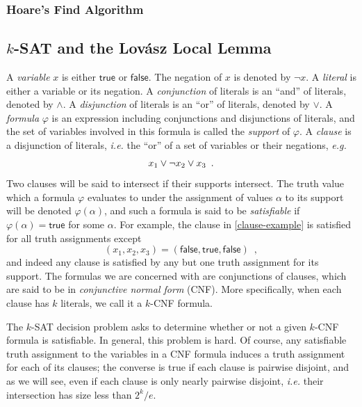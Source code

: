\documentclass{patmorin}
\begin{document}
\subsubsection{Hoare's Find Algorithm}

\subsection{$k$-SAT and the Lov\'{a}sz Local Lemma}

A \emph{variable} $x$ is either $\textsf{true}$ or
$\textsf{false}$. The negation of $x$ is denoted by $\neg x$. A
\emph{literal} is either a variable or its negation. A
\emph{conjunction} of literals is an ``and'' of literals, denoted by
$\land$. A \emph{disjunction} of literals is an ``or'' of literals,
denoted by $\lor$. A \emph{formula} $\varphi$ is an expression
including conjunctions and disjunctions of literals, and the set of
variables involved in this formula is called the \emph{support} of
$\varphi$. A \emph{clause} is a disjunction of literals, \emph{i.e.}
the ``or'' of a set of variables or their negations, \emph{e.g.}
\begin{align}
  x_1 \lor \neg x_2 \lor x_3 \enspace . \eqlabel{clause-example}
\end{align}
Two clauses will be said to intersect if their supports intersect. The
truth value which a formula $\varphi$ evaluates to under the
assignment of values $\alpha$ to its support will be denoted
$\varphi(\alpha)$, and such a formula is said to be \emph{satisfiable}
if $\varphi(\alpha) = \textsf{true}$ for some $\alpha$. For example,
the clause in \eqref{clause-example} is satisfied for all truth
assignments except
\[
(x_1, x_2, x_3) = (\textsf{false}, \textsf{true}, \textsf{false}) \enspace ,
\]
and indeed any clause is satisfied by any but one truth assignment for
its support. The formulas we are concerned with are conjunctions of
clauses, which are said to be in \emph{conjunctive normal form}
(CNF). More specifically, when each clause has $k$ literals, we call
it a $k$-CNF formula.

The $k$-SAT decision problem asks to determine whether or not a given
$k$-CNF formula is satisfiable. In general, this problem is hard. Of
course, any satisfiable truth assignment to the variables in a CNF
formula induces a truth assignment for each of its clauses; the
converse is true if each clause is pairwise disjoint, and as we will
see, even if each clause is only nearly pairwise disjoint, \emph{i.e.}
their intersection has size less than $2^k/e$.
\end{document}
